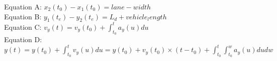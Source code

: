 \documentclass{article}
\begin{document}
	\begin{flushleft}
			Equation A: $x_2(t_0)-x_1(t_0)=lane-width$\\
		Equation B: $y_1(t_e)-y_2(t_e)=L_d+vehicle_length$\\
		Equation C: $v_y(t)=v_y(t_0)+ \int_{t_0}^{t}a_y(u)du$\\
		Equation D: $y(t)=y(t_0)+ \int_{t_0}^{t}v_y(u)du=y(t_0)+v_y(t_0) \times (t-t_0)+ \int_{t_0}^{t}\int_{t_0}^{w}a_y(u)dudw $
	\end{flushleft}

	
	
	
	
	
\end{document}
